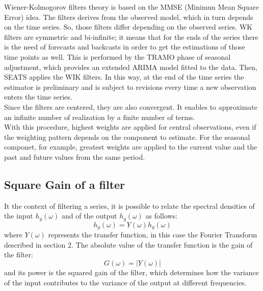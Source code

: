 \documentclass{article}
\begin{document}
Wiener-Kolmogorov filters theory is based on the MMSE (Minimun Mean Square Error) idea. The filters derives from the observed model, which in turn depends on the time series. So, those filters differ depending on the observed series. WK filters are symmetric and bi-infinite; it means that for the ends of the series there is the need of forecasts and backcasts in order to get the estimations of those time points as well. This is performed by the TRAMO phase of seasonal adjustment, which provides an extended ARIMA model fitted to the data. Then, SEATS applies the WIK filters.  In this way, at the end of the time series the estimator is preliminary and is subject to revisions every time a new observation enters the time series.\\ Since the filters are centered, they are also convergent. It enables to approximate an infinite number of realization by a finite number of terms.\\With this procedure, highest weights are applied for central observations, even if the weighting pattern depends on the component to estimate. For the seasonal componet, for example, greatest weights are applied to the current value and the past and future values from the same period.
\subsection*{Square Gain of a filter}
It the context of filtering a series, it is possible to relate the spectral densities of the input $h_{y}(\omega)$ and of the output $h_{g}(\omega)$ as follows:
\begin{equation*}
h_{g}(\omega)=Y(\omega) h_{y}(\omega)
\end{equation*}
where $Y(\omega)$ represents the transfer function, in this case the Fourier Transform described in section 2. The absolute value of the transfer function is the gain of the filter:
\begin{equation*}
G(\omega)=|Y(\omega)|
\end{equation*} 
and its power is the squared gain of the filter, which determines how the variance of the input contributes to the variance of the output at different frequencies.



 
\end{document}
